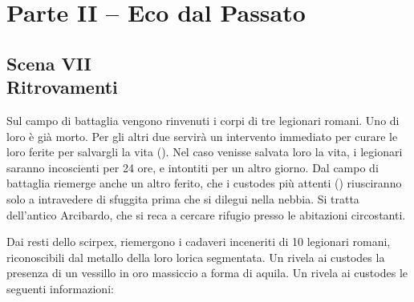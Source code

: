 \documentclass[11.5pt,twocolumn]{article}
\begin{document}
\section*{Parte II -- Eco dal Passato}
%
\subsection*{Scena VII\\Ritrovamenti}

Sul campo di battaglia vengono rinvenuti i corpi di tre legionari romani.
Uno di loro \`{e} gi\`{a} morto. Per gli altri due servir\`{a} un intervento immediato per curare le loro ferite per salvargli la vita ().
Nel caso venisse salvata loro la vita, i legionari saranno incoscienti per 24 ore, e intontiti per un altro giorno.
Dal campo di battaglia riemerge anche un altro ferito, che i custodes pi\`{u} attenti () riusciranno solo a intravedere di sfuggita prima che si dilegui nella nebbia.
Si tratta dell'antico Arcibardo, che si reca a cercare rifugio presso le abitazioni circostanti.


Dai resti dello scirpex, riemergono i cadaveri inceneriti di 10 legionari romani, riconoscibili dal metallo della loro lorica segmentata.
Un  rivela ai custodes la presenza di un vessillo in oro massiccio a forma di aquila.
%
Un  rivela ai custodes le seguenti informazioni:
\end{document}

